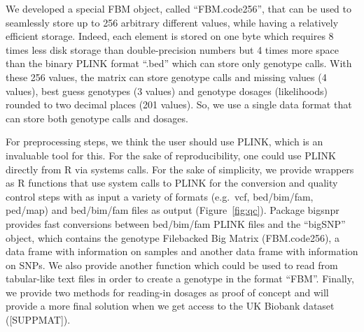 \documentclass{bioinfo}
\begin{document}
\begin{methods}
{\color{red}
We developed a special FBM object, called ``FBM.code256'', that can be used to seamlessly store up to 256 arbitrary different values, while having a relatively efficient storage. Indeed, each element is stored on one byte which requires 8 times less disk storage than double-precision numbers but 4 times more space than the binary PLINK format ``.bed'' which can store only genotype calls. With these 256 values, the matrix can store genotype calls and missing values (4 values), best guess genotypes (3 values) and genotype dosages (likelihoods) rounded to two decimal places (201 values). So, we use a single data format that can store both genotype calls and dosages.

For preprocessing steps, we think the user should use PLINK, which is an invaluable tool for this. For the sake of reproducibility, one could use PLINK directly from R via systems calls. For the sake of simplicity, we provide wrappers as R functions that use system calls to PLINK for the conversion and quality control steps with as input a variety of formats (e.g.\ vcf, bed/bim/fam, ped/map) and bed/bim/fam files as output (Figure~\ref{fig:qc}).
Package bigsnpr provides fast conversions between bed/bim/fam PLINK files and the ``bigSNP'' object, which contains the genotype Filebacked Big Matrix (FBM.code256), a data frame with information on samples and another data frame with information on SNPs. We also provide another function which could be used to read from tabular-like text files in order to create a genotype in the format ``FBM''. Finally, we provide two methods for reading-in dosages as proof of concept and will provide a more final solution when we get access to the UK Biobank dataset ([SUPPMAT]).

}
\end{methods}
\end{document}
